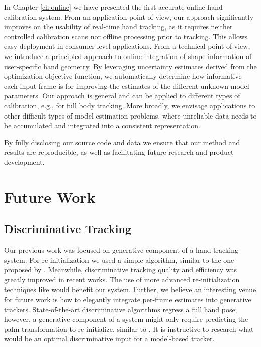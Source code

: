 In Chapter \ref{ch:online} we have presented the first accurate online hand calibration system. 
From an application point of view, our approach significantly improves on the usability of real-time hand tracking, as it requires neither controlled calibration scans nor offline processing prior to tracking. This allows easy deployment in consumer-level applications. From a technical point of view, we introduce a principled approach to online integration of shape information of user-specific hand geometry. By leveraging uncertainty estimates derived from the optimization objective function, we automatically determine how informative each input frame is for improving the estimates of the different unknown model parameters. Our approach is general and can be applied to different types of calibration, e.g., for full body tracking. More broadly, we envisage applications to other difficult types of model estimation problems, where unreliable data needs to be accumulated and integrated into a consistent representation.

By fully disclosing our source code and data we ensure that our method and results are reproducible, as well as facilitating future research and product development. 

\section {Future Work}

\subsection*{Discriminative Tracking}
Our previous work was focused on generative component of a hand tracking system. For re-initialization we used a simple algorithm, similar to the one proposed by \cite{qian2014realtime}. Meanwhile, discriminative tracking quality and efficiency was greatly improved in recent works. 
The use of more advanced re-initialization techniques like \cite{oberweger2017deepprior++} would benefit our system. Further, we believe an interesting venue for future work is how to elegantly integrate per-frame estimates into generative trackers. State-of-the-art discriminative algorithms regress a full hand pose; however, a generative component of a system might only require predicting the palm transformation to re-initialize, similar to \cite{taylor2017articulated}. It is instructive to research what would be an optimal discriminative input for a model-based tracker.

